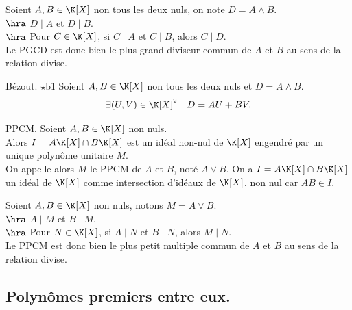 \documentclass[11pt]{article}
\begin{document}
\begin{prop}{}{}
    Soient $A,B\in\K[X]$ non tous les deux nuls, on note $D=A\land B$.\\
    $\hra$ $D \mid A$ et $D \mid B$.\\
    $\hra$ Pour $C\in\K[X]$, si $C \mid A$ et $C\mid B$, alors $C \mid D$.\\
    Le PGCD est donc bien le plus grand diviseur commun de $A$ et $B$ au sens de la relation divise.
\end{prop}

\vspace*{-0.7cm}

\begin{prop}{Bézout. $\star$}{b1}
    Soient $A,B\in\K[X]$ non tous les deux nuls et $D=A\land B$.
    \begin{equation*}
        \exists (U,V) \in \K[X]^2 \quad D=AU+BV.
    \end{equation*}
\end{prop}

\vspace*{-0.7cm}

\begin{defi}{PPCM.}{}
    Soient $A,B\in\K[X]$ non nuls.\\
    Alors $I=A\K[X]\cap B\K[X]$ est un idéal non-nul de $\K[X]$ engendré par un unique polynôme unitaire $M$.\\
    On appelle alors $M$ le PPCM de $A$ et $B$, noté $A\lor B$.
    \tcblower
    On a $I=A\K[X]\cap B\K[X]$ un idéal de $\K[X]$ comme intersection d'idéaux de $\K[X]$, non nul car $AB\in I$.
\end{defi}

\vspace*{-0.7cm}

\begin{prop}{}{}
    Soient $A,B\in\K[X]$ non nuls, notons $M=A\lor B$.\\
    $\hra$ $A\mid M$ et $B\mid M$.\\
    $\hra$ Pour $N\in\K[X]$, si $A\mid N$ et $B\mid N$, alors $M \mid N$.\\
    Le PPCM est donc bien le plus petit multiple commun de $A$ et $B$ au sens de la relation divise.
\end{prop}

\vspace*{-0.7cm}

\subsection{Polynômes premiers entre eux.}
\end{document}
